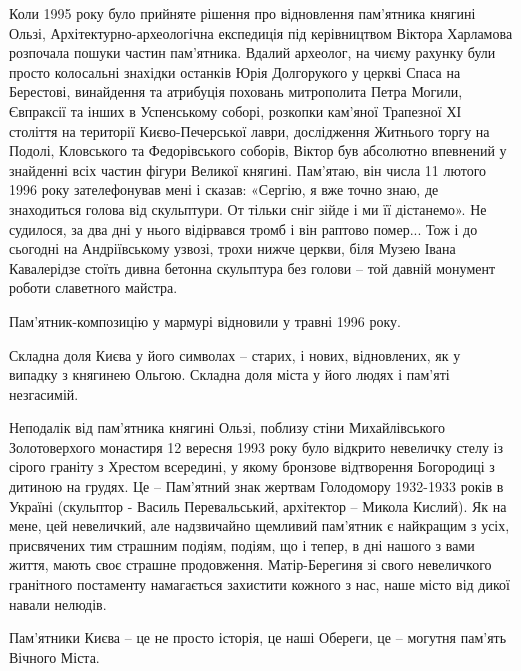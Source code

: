 Коли 1995 року було прийняте рішення про відновлення пам'ятника княгині Ользі,
Архітектурно-археологічна експедиція під керівництвом Віктора Харламова
розпочала пошуки частин пам'ятника. Вдалий археолог, на чиєму рахунку були
просто колосальні знахідки останків Юрія Долгорукого у церкві Спаса на
Берестові, винайдення та атрибуція поховань митрополита Петра Могили, Євпраксії
та інших в Успенському соборі, розкопки кам'яної Трапезної ХІ століття на
території Києво-Печерської лаври, дослідження Житнього торгу на Подолі,
Кловського та Федорівського соборів, Віктор був абсолютно впевнений у знайденні
всіх частин фігури Великої княгині. Пам'ятаю, він  числа 11 лютого 1996 року
зателефонував мені і сказав: «Сергію, я вже точно знаю, де знаходиться голова
від скульптури. От тільки сніг зійде і ми її дістанемо». Не судилося, за два
дні у нього відірвався тромб і він раптово помер... Тож і до сьогодні на
Андріївському узвозі, трохи нижче церкви, біля Музею Івана Кавалерідзе стоїть
дивна бетонна скульптура без голови – той давній монумент роботи славетного
майстра.

Пам'ятник-композицію у мармурі відновили у травні 1996 року.

Складна доля Києва у його символах – старих, і нових, відновлених, як у випадку
з княгинею Ольгою. Складна доля міста у його людях і пам'яті незгасимій.

Неподалік від пам'ятника княгині Ользі, поблизу стіни Михайлівського
Золотоверхого монастиря 12 вересня 1993 року було відкрито невеличку стелу із
сірого граніту з Хрестом всередині, у якому бронзове відтворення Богородиці з
дитиною на грудях. Це – Пам'ятний знак жертвам Голодомору 1932-1933 років в
Україні (скульптор - Василь Перевальський, архітектор – Микола Кислий). Як на
мене, цей невеличкий, але надзвичайно щемливий пам'ятник є найкращим з усіх,
присвячених тим страшним подіям, подіям, що і тепер, в дні нашого з вами життя,
мають своє страшне продовження. Матір-Берегиня зі свого невеличкого гранітного
постаменту намагається захистити кожного з нас, наше місто від дикої навали
нелюдів.

Пам'ятники Києва – це не просто історія, це наші Обереги, це – могутня пам'ять
Вічного Міста.

